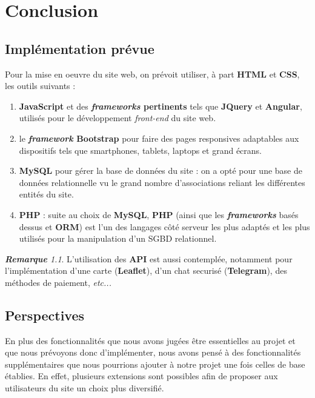 \documentclass[a4paper,12pt]{book}
\theoremstyle{break}
\theoremstyle{break}
\theoremstyle{break}
\theoremstyle{break}
\theoremstyle{definition}
\theoremstyle{remark}
\newtheorem*{remark}{\textbf{Remarque}}
\begin{document}
\chapter{Conclusion}
\section{Implémentation prévue}
Pour la mise en oeuvre du site web, on prévoit utiliser, à part \textbf{HTML} et \textbf{CSS}, les outils suivants :
\begin{enumerate}
  \item{\textbf{JavaScript} et des \textbf{\textit{frameworks} pertinents} tels que \textbf{JQuery} et \textbf{Angular}, utilisés pour le développement \textit{front-end} du site web.}
  \item{le \textbf{\textit{framework} Bootstrap} pour faire des pages responsives adaptables aux dispositifs tels que smartphones, tablets, laptops et grand écrans.}
  \item{\textbf{MySQL} pour gérer la base de données du site : on a opté pour une base de données relationnelle vu le grand nombre d'associations reliant les différentes entités du site.}
  \item{\textbf{PHP} : suite au choix de \textbf{MySQL}, \textbf{PHP} (ainsi que les \textbf{\textit{frameworks}} basés dessus et \textbf{ORM}) est l'un des langages côté serveur les plus adaptés et les plus utilisés pour la manipulation d'un SGBD relationnel.}
\end{enumerate}

\begin{remark}
L'utilisation des \textbf{API} est aussi contemplée, notamment pour l'implémentation d'une carte (\textbf{Leaflet}), d'un chat securisé (\textbf{Telegram}), des méthodes de paiement, \textit{etc...}
\end{remark}
\section{Perspectives}
\label{sec:perspectives}
En plus des fonctionnalités que nous avons jugées être essentielles au projet et que nous prévoyons donc d'implémenter, nous avons pensé à des fonctionnalités supplémentaires que nous pourrions ajouter à notre projet une fois celles de base établies. En effet, plusieurs extensions sont possibles afin de proposer aux utilisateurs du site un choix plus diversifié.
\end{document}
